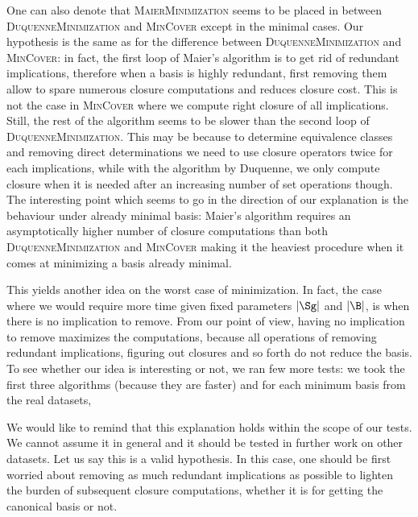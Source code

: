 One can also denote that \textsc{MaierMinimization} seems to be placed in between \textsc{DuquenneMinimization} and \textsc{MinCover} except in the minimal cases. Our hypothesis is the same as for the difference between 
\textsc{DuquenneMinimization} and \textsc{MinCover}: in fact, the first loop of Maier's algorithm is to get rid of redundant implications, therefore when a 
basis is highly redundant, first removing them allow to spare numerous closure
computations and reduces closure cost. This is not the case in \textsc{MinCover}
where we compute right closure of all implications. Still, the rest of the algorithm seems to be slower than the second loop of \textsc{DuquenneMinimization}. This may be because to determine equivalence classes and removing direct determinations we need to use closure operators
twice for each implications, while with the algorithm by Duquenne, we only compute closure when it is needed after an increasing number of set operations though. The interesting point which seems to go in the direction of our explanation is the behaviour under already minimal basis: Maier's algorithm requires an asymptotically higher number of closure computations than both 
\textsc{DuquenneMinimization} and \textsc{MinCover} making it the heaviest 
procedure when it comes at minimizing a basis already minimal.

\vspace{1.2em}

This yields another idea on the worst case of minimization. In fact, the case
where we would require more time given fixed parameters $|\Sg|$ and $|\B|$,
is when there is no implication to remove. From our point of view, having
no implication to remove maximizes the computations, because all operations
of removing redundant implications, figuring out closures and so forth do
not reduce the basis. To see whether our idea is interesting or not, we ran few more tests: we took the first three algorithms (because they are faster) and
for each minimum basis from the real datasets, 

\begin{figure}[ht]
	
\end{figure}

\vspace{1.2em}



We would like to remind that this explanation holds within the scope of our
tests. We cannot assume it in general and it should be tested in further work on other datasets. Let us say this is a valid hypothesis. In this case, one
should be first worried about removing as much  redundant implications as possible to lighten the burden of subsequent closure computations, whether it is for getting the canonical basis or not.


